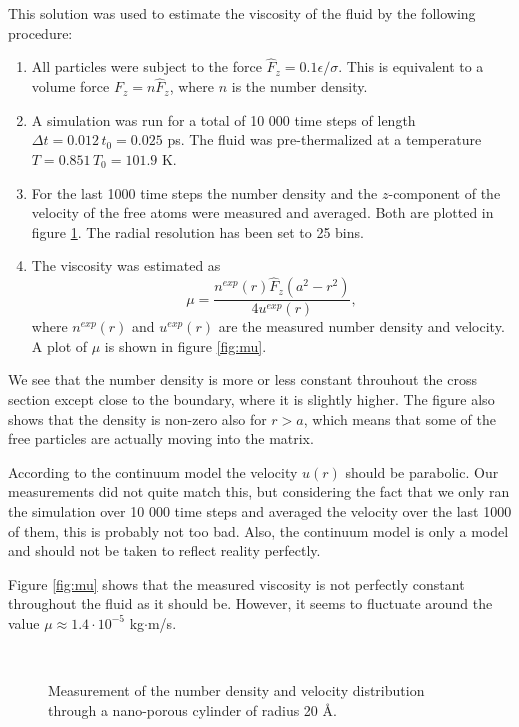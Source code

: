 \documentclass[12pt]{article}
\begin{document}
This solution was used to estimate the viscosity of the fluid by the following procedure:
\begin{enumerate}
 \item All particles were subject to the force $\hat F_z = 0.1\epsilon/\sigma$. This is equivalent to a volume force $F_z = n \hat F_z$, where $n$ is the number density.
 \item A simulation was run for a total of 10 000 time steps of length $\Delta t = 0.012\,t_0 = 0.025$ ps. The fluid was pre-thermalized at a temperature $T = 0.851\,T_0 = 101.9$ K.
 \item For the last 1000 time steps the number density and the $z$-component of the velocity of the free atoms were measured and averaged. Both are plotted in figure \ref{fig:numberAndVelocity}. The radial resolution has been set to 25 bins.
 \item The viscosity was estimated as
 \begin{equation}
  \label{eq:mu}
 \mu = \frac{n^{exp}(r)\hat F_z (a^2 - r^2)}{4 u^{exp}(r)},
 \end{equation}
 where $n^{exp}(r)$ and $u^{exp}(r)$ are the measured number density and velocity. A plot of $\mu$ is shown in figure \ref{fig:mu}.
\end{enumerate}

We see that the number density is more or less constant throuhout the cross section except close to the boundary, where it is slightly higher. The figure also shows that the density
is non-zero also for $r>a$, which means that some of the free particles are actually moving into the matrix.

According to the continuum model the velocity $u(r)$ should be parabolic. Our measurements did not quite match this, but considering the fact that we only ran the simulation over 10 000 time steps and averaged
the velocity over the last 1000 of them, this is probably not too bad. Also, the continuum model is only a model and should not be taken to reflect reality perfectly.

Figure \ref{fig:mu} shows that the measured viscosity is not perfectly constant throughout the fluid as it should be. However, it seems to fluctuate around the value $\mu\approx 1.4\cdot10^{-5}$ kg$\cdot$m/s.

\begin{figure}[!ht]
    \begin{center}
        \hspace{5mm}
        \\ 
    \end{center}
    \caption{Measurement of the number density and velocity distribution through a nano-porous cylinder of radius 20 Å.}
    \label{fig:numberAndVelocity}
\end{figure}
\end{document}

